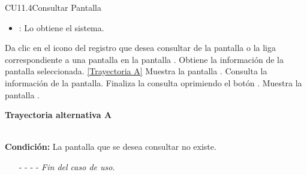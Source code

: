 \begin{UseCase}{CU11.4}{Consultar Pantalla}
{\begin{itemize}
\begin{itemize}
						\item {}: Lo obtiene el sistema.
					\end{itemize}
		\end{itemize}}
	\end{UseCase}
	\begin{UCtrayectoria}
		\UCpaso[\UCactor] Da clic en el icono  del registro que desea consultar de la pantalla  o la liga correspondiente a una pantalla en la pantalla .
		\UCpaso[\UCsist] Obtiene la información de la pantalla seleccionada. \hyperlink{CU11-4:TAA}{[Trayectoria A]}
		\UCpaso[\UCsist] Muestra la pantalla .
		\UCpaso[\UCactor] Consulta la información de la pantalla.
		\UCpaso[\UCactor] Finaliza la consulta oprimiendo el botón .
		\UCpaso[\UCsist] Muestra la pantalla .
	\end{UCtrayectoria}		
	\hypertarget{CU11-4:TAA}{\textbf{Trayectoria alternativa A}}\\
	\noindent \textbf{Condición:} La pantalla que se desea consultar no existe.
	\begin{enumerate}
		\UCpaso[\UCsist] Muestra la pantalla  con el mensaje .
		\item[- -] - - {\em {Fin del caso de uso}}.
	\end{enumerate}

	
